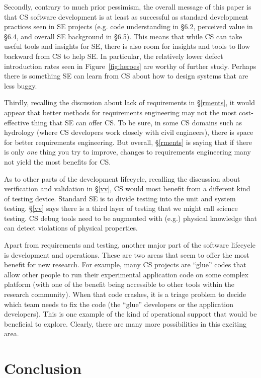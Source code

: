 \documentclass[sigconf,review,anonymous]{acmart}
\begin{document}
Secondly, contrary to much prior pessimism, the overall message of this paper is that CS software development is at least as successful as standard development practices seen in SE projects (e.g. code understanding in \S6.2, perceived value in \S6.4, and overall SE background in \S6.5). This means that while CS can take useful tools and insights for SE, there is also room for insights and tools to flow backward from CS to help SE.
In particular, the relatively lower defect introduction rates seen in Figure~\ref{fig:heroes} are worthy of further study. Perhaps there is something SE can learn from CS about how to design systems that are less buggy.

Thirdly, recalling the discussion about lack of requirements in \S\ref{rments}, it would appear that better methods for requirements engineering may not the most cost-effective thing that SE can offer CS. To be sure, in some CS domains such as hydrology (where CS developers work closely with civil engineers), there is space for better requirements engineering. But overall, \S\ref{rments} is saying that if there is only {\em one} thing you try to improve, changes to requirements engineering many not yield the most benefits for CS.

As to other parts of the development lifecycle,  recalling the discussion about verification and validation in \S\ref{vv}, CS would most benefit from a different kind of testing device. Standard SE is to divide testing into the unit and system testing. \S\ref{vv} says there is a third layer of testing that we might call science testing. CS debug tools need to be augmented with (e.g.)  physical knowledge that can detect violations of physical properties.

Apart from requirements and testing, another major part of the software lifecycle is development and operations. These are two areas that seem to offer the most benefit for new research. For example, many CS projects are ``glue'' codes that allow other people to run their experimental application code on some complex platform (with one of the benefit being accessible to other tools within the research community). When that code crashes, it is a triage problem to decide which team needs to fix the code (the ``glue'' developers or the application developers). This is one example of the kind of operational support that would be beneficial to explore. Clearly, there are many more possibilities in this exciting area.




\section{Conclusion}
\end{document}
